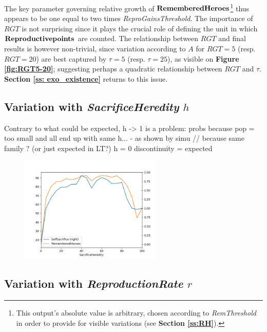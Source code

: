 \documentclass[a4paper,12pt]{report}
\begin{document}
The key parameter governing relative growth of $\bf{RememberedHeroes}$\footnote{
This output's absolute value is arbitrary, chosen according to \emph{RemThreshold} in
order to provide for visible variations (see \textbf{Section \ref{ss:RH}}).
} thus appears to be one equal to two times
\emph{ReproGainsThreshold}. The importance of $RGT$ is not surprising since it plays
the crucial role of defining the unit in which $\bf{Reproductive points}$ are counted.  
The relationship between $RGT$ and final results is however non-trivial, since 
variation according to $A$ for $RGT=5$ (resp. $RGT=20$) are best captured by $\tau=5$
(resp. $\tau=25$), as visible on \textbf{Figure \ref{fig:RGT5-20}}; suggesting perhaps
a quadratic relationship between $RGT$ and $\tau$. \textbf{Section \ref{ss: exo_existence}}
returns to this issue.

\subsection{Variation with \emph{SacrificeHeredity} $h$}

Contrary to what could be expected, h -> 1 is a problem: probs because pop = too small
and all end up with same h... - as shown by simu // because same family ? (or just expected in LT?)
h = 0 discontinuity = expected

\begin{figure}[h]
    \centering
    \includegraphics[width=0.6\textwidth]{Hered_a50}
    \caption{}
    \label{fig:h}
    \end{figure}



\subsection{Variation with \emph{ReproductionRate} $r$}
\end{document}
